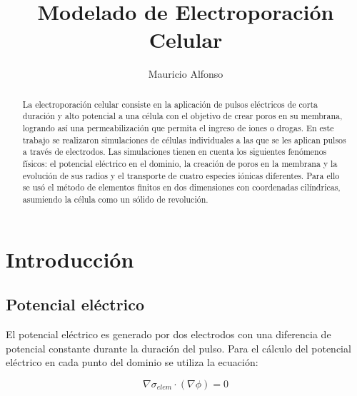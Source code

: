 \documentclass[a4paper,10pt]{article}
\title{Modelado de Electroporación Celular}
\author{Mauricio Alfonso}
\begin{document}
\newcommand{\h}{\ce{H^+}}
\newcommand{\oh}{\ce{OH^-}}
\newcommand{\na}{\ce{Na^+}}
\newcommand{\cl}{\ce{Cl^-}}
\newcommand{\kvm}{$\si{\kilo\volt\per\metre}$}
\newcommand{\usec}{$\si{\micro\second}$}

\maketitle


\begin{abstract}
	La electroporación celular consiste en la aplicación de pulsos eléctricos de corta duración y alto potencial a una célula con el objetivo de crear poros en su membrana, logrando así una permeabilización que permita el ingreso de iones o drogas. En este trabajo se realizaron simulaciones de células individuales a las que se les aplican pulsos a través de electrodos. Las simulaciones tienen en cuenta los siguientes fenómenos físicos: el potencial eléctrico en el dominio, la creación de poros en la membrana y la evolución de sus radios y el transporte de cuatro especies iónicas diferentes. Para ello se usó el método de elementos finitos en dos dimensiones con coordenadas cilíndricas, asumiendo la célula como un sólido de revolución.
	
\end{abstract}

\section{Introducción}



\subsection{Potencial eléctrico}
El potencial eléctrico es generado por dos electrodos con una diferencia de potencial constante durante la duración del pulso. Para el cálculo del potencial eléctrico en cada punto del dominio se utiliza la ecuación: 

\begin{equation} \label{eq:poisson}
	\nabla \sigma_{elem} \cdot (\nabla \phi) = 0 
\end{equation}
\end{document}
